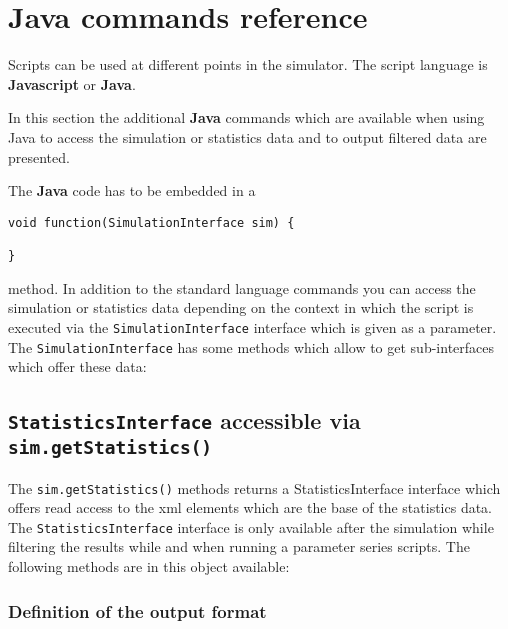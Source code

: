 \part{Java commands reference}

Scripts can be used at different points in the simulator.
The script language is \textbf{Javascript} or \textbf{Java}.

In this section the additional \textbf{Java} commands which
are available when using Java to access the
simulation or statistics data and to output filtered data are
presented.

The \textbf{Java} code has to be embedded in a
\begin{verbatim}
void function(SimulationInterface sim) {

}
\end{verbatim}
method. In addition to the standard language commands you can access
the simulation or statistics data depending on the context in which the script is executed
via the \texttt{SimulationInterface} interface which is given as a parameter.
The \texttt{SimulationInterface} has some methods which allow to get sub-interfaces
which offer these data:



\chapter{\texttt{StatisticsInterface} accessible via \texttt{sim.getStatistics()}}

The \texttt{sim.getStatistics()} methods returns a {StatisticsInterface} interface
which offers read access to the xml elements which are the base of the statistics data.
The \texttt{StatisticsInterface} interface is only available after the
simulation while filtering the results while and when running a parameter series scripts.
The following methods are in this object available:

\section{Definition of the output format}

